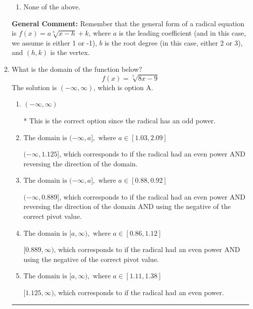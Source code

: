 \documentclass{extbook}[14pt]
\newcommand{\litem}[1]{\item #1

\rule{\textwidth}{0.4pt}}
\begin{document}
\begin{enumerate}
{\begin{enumerate}[label=\Alph*.]
\item None of the above.\end{enumerate}
\textbf{General Comment:} Remember that the general form of a radical equation is $ f(x) = a \sqrt[b]{x - h} + k $, where $a$ is the leading coefficient (and in this case, we assume is either 1 or -1), $b$ is the root degree (in this case, either 2 or 3), and $(h, k)$ is the vertex.
}
\litem{
What is the domain of the function below?
\[ f(x) = \sqrt[7]{8 x - 9} \]The solution is \( (-\infty, \infty) \), which is option A.\begin{enumerate}[label=\Alph*.]
\item \( (-\infty, \infty) \)

* This is the correct option since the radical has an odd power.
\item \( \text{The domain is } (-\infty, a], \text{   where } a \in [1.03, 2.09] \)

$(-\infty, 1.125]$, which corresponds to if the radical had an even power AND reversing the direction of the domain.
\item \( \text{The domain is } (-\infty, a], \text{   where } a \in [0.88, 0.92] \)

$(-\infty, 0.889]$, which corresponds to if the radical had an even power AND reversing the direction of the domain AND using the negative of the correct pivot value.
\item \( \text{The domain is } [a, \infty), \text{   where } a \in [0.86, 1.12] \)

$[0.889, \infty)$, which corresponds to if the radical had an even power AND using the negative of the correct pivot value.
\item \( \text{The domain is } [a, \infty), \text{   where } a \in [1.11, 1.38] \)

$[1.125, \infty)$, which corresponds to if the radical had an even power.
\end{enumerate}

}
\end{enumerate}
\end{document}
